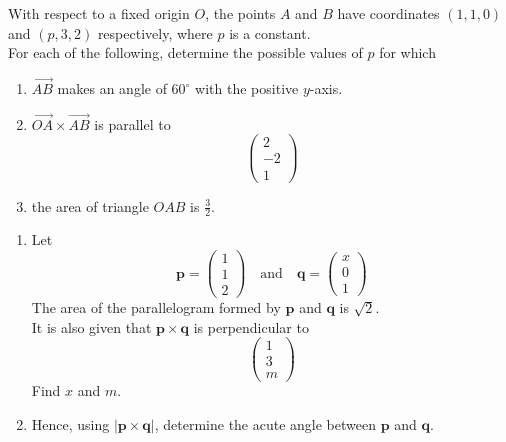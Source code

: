 \documentclass[leqno]{article}
\begin{document}
\begin{enumerate}[
  label=\textbf{\arabic*.},
  leftmargin=*,
  topsep=0pt,
  partopsep=0pt,
  parsep=0pt
]
\newpage

\questionitem

With respect to a fixed origin $O$, the points $A$ and $B$ have coordinates $(1, 1, 0)$ and $(p, 3, 2)$ respectively, where $p$ is a constant. \\

For each of the following, determine the possible values of $p$ for which \\

\begin{enumerate}[label=\textbf{(\alph*)}]
  \item $\overrightarrow{AB}$ makes an angle of $60^\circ$ with the positive $y$-axis.  \\
  \item $\overrightarrow{OA} \times \overrightarrow{AB}$ is parallel to
  \[
  \begin{pmatrix}2\\-2\\1\end{pmatrix}
  \]
  \item the area of triangle $OAB$ is $\tfrac{3}{2}$.  \\
\end{enumerate}


\newpage


\questionitem

\begin{enumerate}[label=\textbf{(\alph*)}]
  \item Let
  \[
  \mathbf{p}=\begin{pmatrix}1\\1\\2\end{pmatrix}
  \quad\text{and}\quad
  \mathbf{q}=\begin{pmatrix}x\\0\\1\end{pmatrix}
  \]
  The area of the parallelogram formed by $\mathbf{p}$ and $\mathbf{q}$ is $\sqrt{2}$.\\
  It is also given that $\mathbf{p}\times\mathbf{q}$ is perpendicular to
  \[
  \begin{pmatrix}1\\3\\m\end{pmatrix}
  \]
  Find $x$ and $m$.  \\
  \item Hence, using $|\mathbf{p}\times\mathbf{q}|$, determine the acute angle between $\mathbf{p}$ and $\mathbf{q}$.  \\
\end{enumerate}


\end{enumerate}
\end{document}
